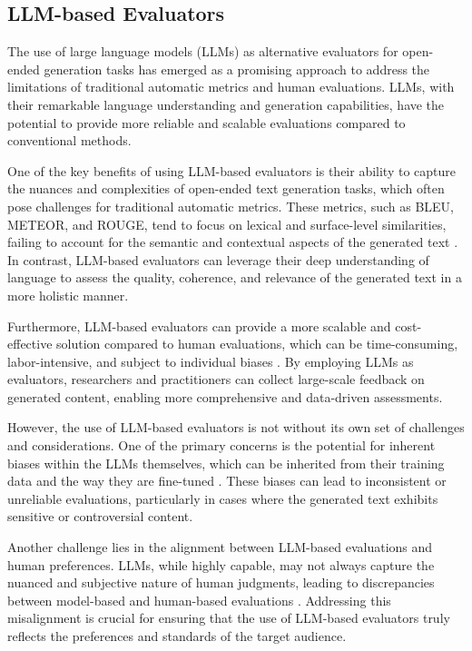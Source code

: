 \documentclass[11pt]{article}
\begin{document}
\subsection{LLM-based Evaluators}

The use of large language models (LLMs) as alternative evaluators for open-ended generation tasks has emerged as a promising approach to address the limitations of traditional automatic metrics and human evaluations. LLMs, with their remarkable language understanding and generation capabilities, have the potential to provide more reliable and scalable evaluations compared to conventional methods.

One of the key benefits of using LLM-based evaluators is their ability to capture the nuances and complexities of open-ended text generation tasks, which often pose challenges for traditional automatic metrics. These metrics, such as BLEU, METEOR, and ROUGE, tend to focus on lexical and surface-level similarities, failing to account for the semantic and contextual aspects of the generated text \cite{ref123}. In contrast, LLM-based evaluators can leverage their deep understanding of language to assess the quality, coherence, and relevance of the generated text in a more holistic manner.

Furthermore, LLM-based evaluators can provide a more scalable and cost-effective solution compared to human evaluations, which can be time-consuming, labor-intensive, and subject to individual biases \cite{ref66}. By employing LLMs as evaluators, researchers and practitioners can collect large-scale feedback on generated content, enabling more comprehensive and data-driven assessments.

However, the use of LLM-based evaluators is not without its own set of challenges and considerations. One of the primary concerns is the potential for inherent biases within the LLMs themselves, which can be inherited from their training data and the way they are fine-tuned \cite{ref124}. These biases can lead to inconsistent or unreliable evaluations, particularly in cases where the generated text exhibits sensitive or controversial content.

Another challenge lies in the alignment between LLM-based evaluations and human preferences. LLMs, while highly capable, may not always capture the nuanced and subjective nature of human judgments, leading to discrepancies between model-based and human-based evaluations \cite{ref125}. Addressing this misalignment is crucial for ensuring that the use of LLM-based evaluators truly reflects the preferences and standards of the target audience.
\end{document}
